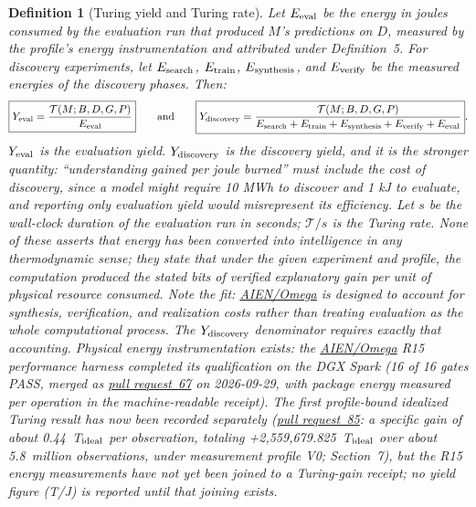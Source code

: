 \documentclass[11pt]{article}
\newtheorem{definition}{Definition}
\begin{document}
\begin{definition}[Turing yield and Turing rate]
Let \(E_{\rm eval}\) be the energy in joules consumed by the evaluation run that produced \(M\)'s predictions on \(D\), measured by the profile's energy instrumentation and attributed under Definition~5. For discovery experiments, let \(E_{\rm search}\), \(E_{\rm train}\), \(E_{\rm synthesis}\), and \(E_{\rm verify}\) be the measured energies of the discovery phases. Then:
\[
\boxed{Y_{\rm eval} = \frac{\mathcal{T}(M;B,D,G,P)}{E_{\rm eval}}}
\qquad\text{and}\qquad
\boxed{Y_{\rm discovery} = \frac{\mathcal{T}(M;B,D,G,P)}{E_{\rm search}+E_{\rm train}+E_{\rm synthesis}+E_{\rm verify}+E_{\rm eval}}}.
\]
\(Y_{\rm eval}\) is the evaluation yield. \(Y_{\rm discovery}\) is the discovery yield, and it is the stronger quantity: ``understanding gained per joule burned'' must include the cost of discovery, since a model might require 10 MWh to discover and 1 kJ to evaluate, and reporting only evaluation yield would misrepresent its efficiency. Let \(s\) be the wall-clock duration of the evaluation run in seconds; \(\mathcal{T}/s\) is the Turing rate. None of these asserts that energy has been converted into intelligence in any thermodynamic sense; they state that under the given experiment and profile, the computation produced the stated bits of verified explanatory gain per unit of physical resource consumed. Note the fit: \href{https://github.com/aien-dev/omega}{AIEN/Omega} is designed to account for synthesis, verification, and realization costs rather than treating evaluation as the whole computational process. The \(Y_{\rm discovery}\) denominator requires exactly that accounting. Physical energy instrumentation exists: the \href{https://github.com/aien-dev/omega}{AIEN/Omega} R15 performance harness completed its qualification on the DGX Spark (16 of 16 gates PASS, merged as \href{https://github.com/aien-dev/omega/pull/67}{pull request~67} on 2026-09-29, with package energy measured per operation in the machine-readable receipt). The first profile-bound idealized Turing result has now been recorded separately (\href{https://github.com/aien-dev/omega/pull/85}{pull request~85}: a specific gain of about 0.44~T\(_{\rm ideal}\) per observation, totaling +2,559,679.825~T\(_{\rm ideal}\) over about 5.8~million observations, under measurement profile V0; Section~7), but the R15 energy measurements have not yet been joined to a Turing-gain receipt; no \textit{yield} figure (T/J) is reported until that joining exists.
\end{definition}
\end{document}
